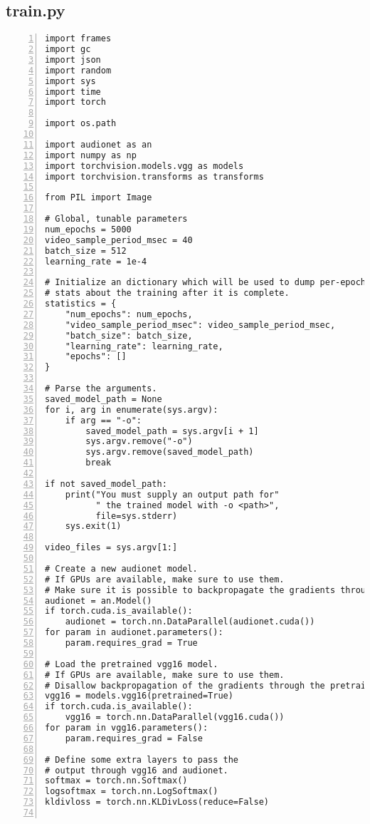 \subsection{train.py}
\label{subsec:train.py}

{\setlength{\fboxsep}{10pt}
\scriptsize
\begin{Verbatim}[frame=leftline, numbers=left, xleftmargin=5mm]
import frames
import gc
import json
import random
import sys
import time
import torch

import os.path

import audionet as an
import numpy as np
import torchvision.models.vgg as models
import torchvision.transforms as transforms

from PIL import Image

# Global, tunable parameters
num_epochs = 5000
video_sample_period_msec = 40
batch_size = 512
learning_rate = 1e-4

# Initialize an dictionary which will be used to dump per-epoch
# stats about the training after it is complete.
statistics = {
    "num_epochs": num_epochs,
    "video_sample_period_msec": video_sample_period_msec,
    "batch_size": batch_size,
    "learning_rate": learning_rate,
    "epochs": []
}

# Parse the arguments.
saved_model_path = None
for i, arg in enumerate(sys.argv):
    if arg == "-o":
        saved_model_path = sys.argv[i + 1]
        sys.argv.remove("-o")
        sys.argv.remove(saved_model_path)
        break

if not saved_model_path:
    print("You must supply an output path for"
          " the trained model with -o <path>",
          file=sys.stderr)
    sys.exit(1)

video_files = sys.argv[1:]

# Create a new audionet model.
# If GPUs are available, make sure to use them.
# Make sure it is possible to backpropagate the gradients through audionet.
audionet = an.Model()
if torch.cuda.is_available():
    audionet = torch.nn.DataParallel(audionet.cuda())
for param in audionet.parameters():
    param.requires_grad = True

# Load the pretrained vgg16 model.
# If GPUs are available, make sure to use them.
# Disallow backpropagation of the gradients through the pretrained vgg16 model.
vgg16 = models.vgg16(pretrained=True)
if torch.cuda.is_available():
    vgg16 = torch.nn.DataParallel(vgg16.cuda())
for param in vgg16.parameters():
    param.requires_grad = False

# Define some extra layers to pass the
# output through vgg16 and audionet.
softmax = torch.nn.Softmax()
logsoftmax = torch.nn.LogSoftmax()
kldivloss = torch.nn.KLDivLoss(reduce=False)


\end{Verbatim}}
